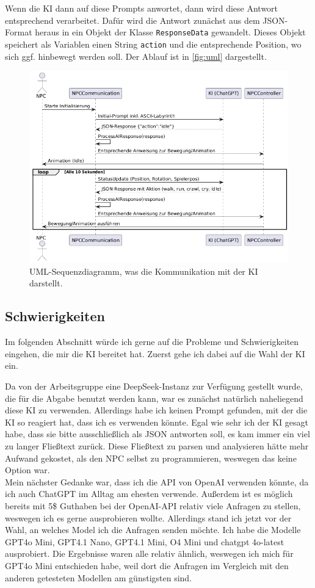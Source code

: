 \documentclass[a4paper]{article}
\begin{document}
Wenn die KI dann auf diese Prompts anwortet, dann wird diese Antwort entsprechend verarbeitet. Dafür wird die Antwort zunächst aus dem JSON-Format heraus in ein Objekt der Klasse \texttt{ResponseData} gewandelt. Dieses Objekt speichert als Variablen einen String \texttt{action} und die entsprechende Position, wo sich ggf. hinbewegt werden soll. Der Ablauf ist in \autoref{fig:uml} dargestellt.

\begin{figure}[h]
	\centering
	\includegraphics[width=.7\textwidth]{img/UML.png}
	\caption{UML-Sequenzdiagramm, was die Kommunikation mit der KI darstellt.}
	\label{fig:uml}
\end{figure}

\subsection{Schwierigkeiten}
Im folgenden Abschnitt würde ich gerne auf die Probleme und Schwierigkeiten eingehen, die mir die KI bereitet hat. Zuerst gehe ich dabei auf die Wahl der KI ein. 

Da von der Arbeitsgruppe eine DeepSeek-Instanz zur Verfügung gestellt wurde, die für die Abgabe benutzt werden kann, war es zunächst natürlich naheliegend diese KI zu verwenden. Allerdings habe ich keinen Prompt gefunden, mit der die KI so reagiert hat, dass ich es verwenden könnte. Egal wie sehr ich der KI gesagt habe, dass sie bitte ausschließlich als JSON antworten soll, es kam immer ein viel zu langer Fließtext zurück. Diese Fließtext zu parsen und analysieren hätte mehr Aufwand gekostet, als den NPC selbst zu programmieren, weswegen das keine Option war.\\
Mein nächster Gedanke war, dass ich die API von OpenAI verwenden könnte, da ich auch ChatGPT im Alltag am ehesten verwende. Außerdem ist es möglich bereits mit 5\$ Guthaben bei der OpenAI-API relativ viele Anfragen zu stellen, weswegen ich es gerne ausprobieren wollte. Allerdings stand ich jetzt vor der Wahl, an welches Model ich die Anfragen senden möchte. Ich habe die Modelle GPT4o Mini, GPT4.1 Nano, GPT4.1 Mini, O4 Mini und chatgpt 4o-latest ausprobiert. Die Ergebnisse waren alle relativ ähnlich, weswegen ich mich für GPT4o Mini entschieden habe, weil dort die Anfragen im Vergleich mit den anderen getesteten Modellen am günstigsten sind. 
\end{document}
